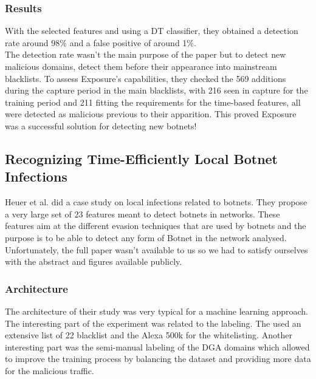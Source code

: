 \subsubsection{Results}
With the selected features and using a DT classifier, they obtained a detection rate around 98\% and a false positive of around 1\%. \\The detection rate wasn't the main purpose of the paper but to detect new malicious domains, detect them before their appearance into mainstream blacklists. To assess Exposure's capabilities, they checked the 569 additions during the capture period in the main blacklists, with 216 seen in capture for the training period and 211 fitting the requirements for the time-based features, all were detected as malicious previous to their apparition. This proved Exposure was a successful solution for detecting new botnets!


\subsection{Recognizing Time-Efficiently Local Botnet Infections}
Heuer et al.\cite{localbotnet} did a case study on local infections related to botnets. They propose a very large set of 23 features meant to detect botnets in networks. These features aim at the different evasion techniques that are used by botnets and the purpose is to be able to detect any form of Botnet in the network analysed. Unfortunately, the full paper wasn't available to us so we had to satisfy ourselves with the abstract and figures available publicly.

\subsubsection{Architecture}
The architecture of their study was very typical for a machine learning approach. The interesting part of the experiment was related to the labeling. The used an extensive list of 22 blacklist and the Alexa 500k for the whitelisting. Another interesting part was the semi-manual labeling of the DGA domains which allowed to improve the training process by balancing the dataset and providing more data for the malicious traffic.

